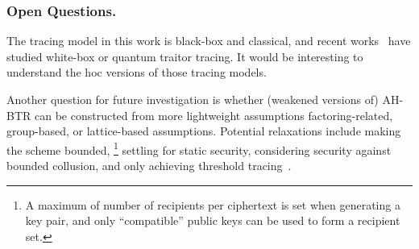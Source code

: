 \subsubsection{Open Questions.}
The tracing model in this work is black-box and classical, and recent works~\cite{C:Zhandry21,TCC:Zhandry20} have studied white-box or quantum traitor tracing.
It would be interesting to understand the \ad hoc versions of those tracing models.

Another question for future investigation is whether
(weakened versions of) AH-BTR can be constructed from more lightweight assumptions factoring-related, group-based, or lattice-based assumptions.
Potential relaxations include
making the scheme bounded,%
\footnote{A maximum of number of recipients per ciphertext is set when generating a key pair, and only ``compatible'' public keys can be used to form a recipient set.}
settling for static security,
considering security against bounded collusion, and
only achieving threshold tracing~\cite{C:NaoPin98}.
